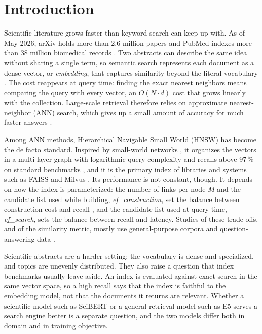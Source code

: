 \documentclass[runningheads]{llncs}
\newcommand{\efc}{\textit{ef\_construction}}
\newcommand{\efs}{\textit{ef\_search}}
\begin{document}
\section{Introduction}

Scientific literature grows faster than keyword search can keep up with. As of May 2026,
arXiv holds more than 2.6 million papers \cite{ref1} and PubMed indexes more than 38
million biomedical records \cite{ref2}. Two abstracts can describe the same idea without
sharing a single term, so semantic search represents each document as a dense vector, or
\textit{embedding}, that captures similarity beyond the literal vocabulary \cite{ref3}. The
cost reappears at query time: finding the exact nearest neighbors means comparing the query
with every vector, an $O(N \cdot d)$ cost that grows linearly with the collection. Large-scale
retrieval therefore relies on approximate nearest-neighbor (ANN) search, which gives up a
small amount of accuracy for much faster answers \cite{ref4}.

Among ANN methods, Hierarchical Navigable Small World (HNSW) \cite{ref5} has become the de
facto standard. Inspired by small-world networks \cite{ref6}, it organizes the vectors in a
multi-layer graph with logarithmic query complexity and recalls above 97\,\% on standard
benchmarks \cite{ref5}, and it is the primary index of libraries and systems such as FAISS
\cite{ref7} and Milvus \cite{ref8}. Its performance is not constant, though. It depends on
how the index is parameterized: the number of links per node $M$ and the candidate list used
while building, \efc{}, set the balance between construction cost and recall \cite{ref9}, and
the candidate list used at query time, \efs{}, sets the balance between recall and latency.
Studies of these trade-offs, and of the similarity metric, mostly use general-purpose corpora
and question-answering data \cite{ref11,ref12}.

Scientific abstracts are a harder setting: the vocabulary is dense and specialized, and
topics are unevenly distributed. They also raise a question that index benchmarks usually
leave aside. An index is evaluated against exact search in the same vector space, so a high
recall says that the index is faithful to the embedding model, not that the documents it
returns are relevant. Whether a scientific model such as SciBERT \cite{ref18} or a general
retrieval model such as E5 \cite{ref19} serves a search engine better is a separate question,
and the two models differ both in domain and in training objective.
\end{document}
